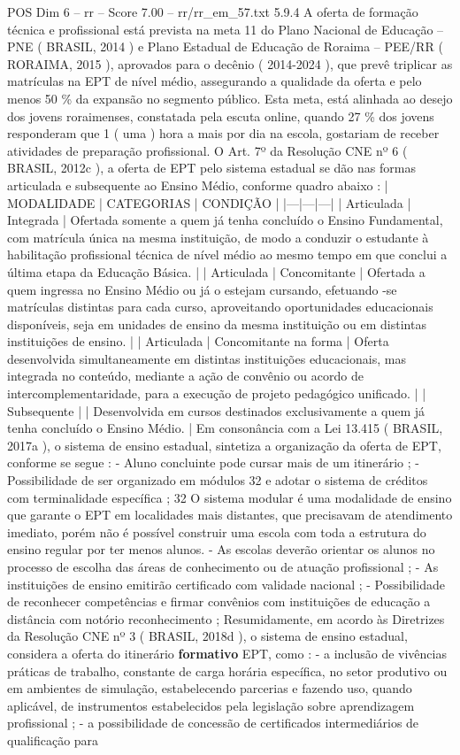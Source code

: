 \begin{textsample}{POS Dim 6 – rr – Score 7.00 – rr/rr\_em\_57.txt}  \label{ex:f6_pos_216}
5.9.4 A oferta de formação técnica e profissional está prevista na meta 11 do Plano Nacional de Educação – PNE ( BRASIL, 2014 ) e Plano Estadual de Educação de Roraima – PEE/RR ( RORAIMA, 2015 ), aprovados para o decênio ( 2014-2024 ), que prevê triplicar as matrículas na EPT de nível médio, assegurando a qualidade da oferta e pelo menos 50 \% da expansão no segmento público.
Esta meta, está alinhada ao desejo dos jovens roraimenses, constatada pela escuta online, quando 27 \% dos jovens responderam que 1 ( uma ) hora a mais por dia na escola, gostariam de receber atividades de preparação profissional.
O Art. 7º da Resolução CNE nº 6 ( BRASIL, 2012c ), a oferta de EPT pelo sistema estadual se dão nas formas articulada e subsequente ao Ensino Médio, conforme quadro abaixo : | MODALIDADE | CATEGORIAS | CONDIÇÃO | |---|---|---| | Articulada | Integrada | Ofertada somente a quem já tenha concluído o Ensino Fundamental, com matrícula única na mesma instituição, de modo a conduzir o estudante à habilitação profissional técnica de nível médio ao mesmo tempo em que conclui a última etapa da Educação Básica. | | Articulada | Concomitante | Ofertada a quem ingressa no Ensino Médio ou já o estejam cursando, efetuando -se matrículas distintas para cada curso, aproveitando oportunidades educacionais disponíveis, seja em unidades de ensino da mesma instituição ou em distintas instituições de ensino. | | Articulada | Concomitante na forma | Oferta desenvolvida simultaneamente em distintas instituições educacionais, mas integrada no conteúdo, mediante a ação de convênio ou acordo de intercomplementaridade, para a execução de projeto pedagógico unificado. | | Subsequente | | Desenvolvida em cursos destinados exclusivamente a quem já tenha concluído o Ensino Médio. | Em consonância com a Lei 13.415 ( BRASIL, 2017a ), o sistema de ensino estadual, sintetiza a organização da oferta de EPT, conforme se segue : - Aluno concluinte pode cursar mais de um itinerário ; - Possibilidade de ser organizado em módulos 32 e adotar o sistema de créditos com terminalidade específica ; 32 O sistema modular é uma modalidade de ensino que garante o EPT em localidades mais distantes, que precisavam de atendimento imediato, porém não é possível construir uma escola com toda a estrutura do ensino regular por ter menos alunos. - As escolas deverão orientar os alunos no processo de escolha das áreas de conhecimento ou de atuação profissional ; - As instituições de ensino emitirão certificado com validade nacional ; - Possibilidade de reconhecer competências e firmar convênios com instituições de educação a distância com notório reconhecimento ; Resumidamente, em acordo às Diretrizes da Resolução CNE nº 3 ( BRASIL, 2018d ), o sistema de ensino estadual, considera a oferta do itinerário \textbf{formativo} EPT, como : - a inclusão de vivências práticas de trabalho, constante de carga horária específica, no setor produtivo ou em ambientes de simulação, estabelecendo parcerias e fazendo uso, quando aplicável, de instrumentos estabelecidos pela legislação sobre aprendizagem profissional ; - a possibilidade de concessão de certificados intermediários de qualificação para 
\end{textsample}
